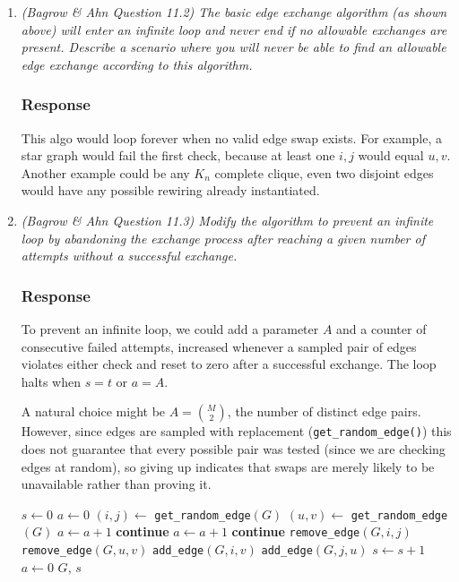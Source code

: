 \documentclass{article}
\newcommand{\response}{\subsubsection*{Response}}
\begin{document}
\begin{enumerate}[label=(\alph*)]
    \item \textit{(Bagrow \& Ahn Question 11.2) The basic edge exchange algorithm (as shown above) will enter an infinite loop and never end if no allowable exchanges are present. Describe a scenario where you will never be able to find an allowable edge exchange according to this algorithm.}
    \response
    This algo would loop forever when no valid edge swap exists. For example, a star graph would fail the first check, because at least one $i,j$ would equal $u,v$. Another example could be any $K_n$ complete clique, even two disjoint edges would have any possible rewiring already instantiated. 

    \item \textit{(Bagrow \& Ahn Question 11.3) Modify the algorithm to prevent an infinite loop by abandoning the exchange process after reaching a given number of attempts without a successful exchange.}
    \response
    To prevent an infinite loop, we could add a parameter $A$ and a counter of consecutive failed attempts, increased whenever a sampled pair of edges violates either check and reset to zero after a successful exchange. The loop halts when $s = t$ or $a = A$. 
    
    A natural choice might be $A = \binom{M}{2}$, the number of distinct edge pairs. However, since edges are sampled with replacement (\texttt{get\_random\_edge()}) this does not guarantee that every possible pair was tested (since we are checking edges at random), so giving up indicates that swaps are merely likely to be unavailable rather than proving it.

    \begin{algorithmic}[1]
    \State $s \gets 0$ 
    \State $a \gets 0$ 
        \State $(i, j) \gets$ \texttt{get\_random\_edge}$(G)$
        \State $(u, v) \gets$ \texttt{get\_random\_edge}$(G)$
            \State $a \gets a + 1$
            \State \textbf{continue}
        \EndIf
            \State $a \gets a + 1$
            \State \textbf{continue}
        \EndIf
        \State \texttt{remove\_edge}$(G, i, j)$
        \State \texttt{remove\_edge}$(G, u, v)$
        \State \texttt{add\_edge}$(G, i, v)$
        \State \texttt{add\_edge}$(G, j, u)$
        \State $s \gets s + 1$
        \State $a \gets 0$ 
    \EndWhile
    \State \Return $G$, $s$
\EndProcedure
\end{algorithmic}
    

\end{enumerate}
\end{document}
